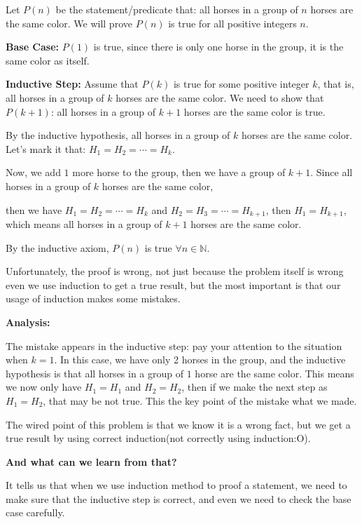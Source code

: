 \documentclass{Math_Note}
\begin{document}
\begin{sol}
    Let $P(n)$ be the statement/predicate that: all horses in a group of $n$ horses are the same color. We will prove $P(n)$ is true for all positive integers $n$.

    \textbf{Base Case:} $P(1)$ is true, since there is only one horse in the group, it is the same color as itself.

    \textbf{Inductive Step:} Assume that $P(k)$ is true for some positive integer $k$, that is, all horses in a group of $k$ horses are the same color. We need to show that $P(k+1)$: all horses in a group of $k+1$ horses are the same color is true.

    By the inductive hypothesis, all horses in a group of $k$ horses are the same color. Let's mark it that: $H_{1}=H_{2}=\cdots=H_{k}$.
    
    Now, we add $1$ more horse to the group, then we have a group of $k+1$. Since all horses in a group of $k$ horses are the same color,

    then we have $H_{1}=H_{2}=\cdots=H_{k}$ and $H_{2}=H_{3}=\cdots=H_{k+1}$, then $H_{1}=H_{k+1}$, which means all horses in a group of $k+1$ horses are the same color.

    By the inductive axiom, $P(n)$ is true $\forall n \in \mathbb{N}$.
\end{sol}

Unfortunately, the proof is wrong, not just because the problem itself is wrong even we use induction to get a true result, but the most important is that our usage of induction makes some mistakes.

\textbf{Analysis:}

The mistake appears in the inductive step: pay your attention to the situation when $k=1$. In this case, we have only 2 horses in the group, and the inductive hypothesis is that all horses in a group of $1$ horse are the same color. 
This means we now only have $H_{1}=H_{1}$ and $H_{2}=H_{2}$, then if we make the next step as $H_{1}=H_{2}$, that may be not true. This the key point of the mistake what we made.

The wired point of this problem is that we know it is a wrong fact, but we get a true result by using correct induction(not correctly using induction:O).

\textbf{And what can we learn from that?} 

It tells us that when we use induction method to proof a statement, we need to make sure that the inductive step is correct, and even we need to check the base case carefully.
\end{document}
